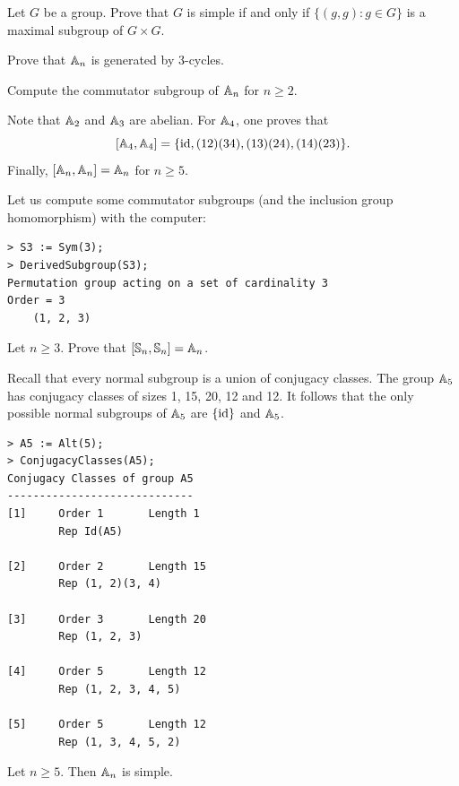 \begin{exercise}
\label{xca:diagonal}
    Let $G$ be a group. 
    Prove that $G$ is simple if and only if 
    $\{(g,g):g\in G\}$ 
    is a maximal subgroup of $G\times G$. 
\end{exercise}

\begin{exercise}
    Prove that $\mathbb{A}_n$ is generated by 3-cycles. 
\end{exercise}

\begin{exercise}
    Compute the commutator subgroup of $\mathbb{A}_n$ for
    $n\geq2$. 
\end{exercise}

Note that $\mathbb{A}_2$ and $\mathbb{A}_3$ are abelian. 
For $\mathbb{A}_4$, one proves that 
\[
[\mathbb{A}_4,\mathbb{A}_4]=\{\operatorname{id},(12)(34),(13)(24),(14)(23)\}.
\]
Finally, $[\mathbb{A}_n,\mathbb{A}_n]=\mathbb{A}_n$ for $n\geq5$. 

Let us compute some commutator subgroups (and the inclusion group homomorphism)  
with the computer:
\begin{lstlisting}
> S3 := Sym(3);
> DerivedSubgroup(S3);
Permutation group acting on a set of cardinality 3
Order = 3
    (1, 2, 3)   
\end{lstlisting}

\begin{exercise}
    Let $n\geq3$. 
    Prove that $[\mathbb{S}_n,\mathbb{S}_n]=\mathbb{A}_n$. 
\end{exercise}

Recall that every normal subgroup is a union of conjugacy classes. The group 
$\mathbb{A}_5$ has conjugacy classes of sizes 1, 15, 20, 12 and 12. It follows that 
the only possible normal subgroups of $\mathbb{A}_5$ are $\{\operatorname{id}\}$ and $\mathbb{A}_5$. 
\begin{lstlisting}
> A5 := Alt(5);
> ConjugacyClasses(A5);
Conjugacy Classes of group A5
-----------------------------
[1]     Order 1       Length 1
        Rep Id(A5)

[2]     Order 2       Length 15
        Rep (1, 2)(3, 4)

[3]     Order 3       Length 20
        Rep (1, 2, 3)

[4]     Order 5       Length 12
        Rep (1, 2, 3, 4, 5)

[5]     Order 5       Length 12
        Rep (1, 3, 4, 5, 2)
\end{lstlisting}

\begin{theorem}[Jordan]
\label{thm:Jordan}
    Let $n\geq5$. Then $\mathbb{A}_n$ is simple. 
\end{theorem}

